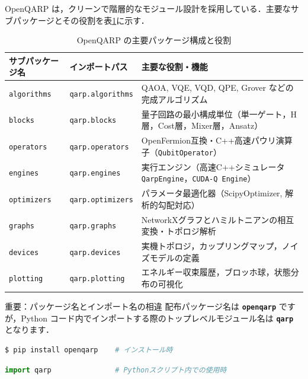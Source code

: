 \documentclass[11pt,a4paper]{ltjsarticle}
\begin{document}
OpenQARP は，クリーンで階層的なモジュール設計を採用している．主要なサブパッケージとその役割を表\ref{tab:qarp_packages}に示す．

\begin{table}[H]
\centering
\caption{OpenQARP の主要パッケージ構成と役割}
\label{tab:qarp_packages}
\vspace{1mm}
\begin{tabularx}{\textwidth}{llX}
\toprule
\textbf{サブパッケージ名} & \textbf{インポートパス} & \textbf{主要な役割・機能} \\
\midrule
\texttt{algorithms} & \texttt{qarp.algorithms} & QAOA, VQE, VQD, QPE, Grover などの完成アルゴリズム \\
\texttt{blocks} & \texttt{qarp.blocks} & 量子回路の最小構成単位（単一ゲート，H層，Cost層，Mixer層，Ansatz） \\
\texttt{operators} & \texttt{qarp.operators} & OpenFermion互換・C++高速パウリ演算子（\texttt{QubitOperator}） \\
\texttt{engines} & \texttt{qarp.engines} & 実行エンジン（高速C++シミュレータ \texttt{QarpEngine}，\texttt{CUDA-Q Engine}） \\
\texttt{optimizers} & \texttt{qarp.optimizers} & パラメータ最適化器（ScipyOptimizer, 解析的勾配対応） \\
\texttt{graphs} & \texttt{qarp.graphs} & NetworkXグラフとハミルトニアンの相互変換・トポロジ解析 \\
\texttt{devices} & \texttt{qarp.devices} & 実機トポロジ，カップリングマップ，ノイズモデルの定義 \\
\texttt{plotting} & \texttt{qarp.plotting} & エネルギー収束履歴，ブロッホ球，状態分布の可視化 \\
\bottomrule
\end{tabularx}
\end{table}

\begin{alertbox}{重要：パッケージ名とインポート名の相違}
配布パッケージ名は \textbf{\texttt{openqarp}} ですが，Python コード内でインポートする際のトップレベルモジュール名は \textbf{\texttt{qarp}} となります．
\begin{lstlisting}[language=bash]
$ pip install openqarp    # インストール時
\end{lstlisting}
\begin{lstlisting}[language=python]
import qarp               # Pythonスクリプト内での使用時
\end{lstlisting}
\end{alertbox}
\end{document}
